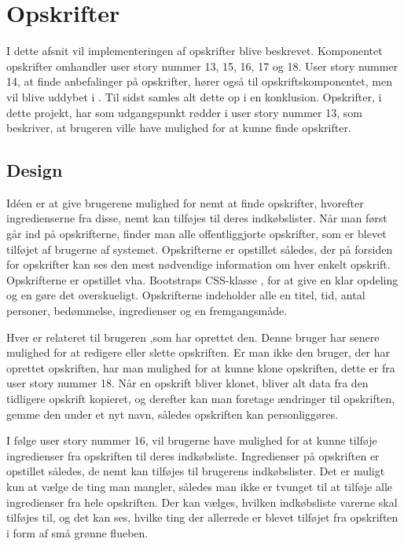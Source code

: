 \section{Opskrifter}
I dette afsnit vil implementeringen af opskrifter blive beskrevet. 
Komponentet opskrifter omhandler user story nummer 13, 15, 16, 17 og 18.
User story nummer 14, at finde anbefalinger på opskrifter, hører også til opskriftskomponentet, men vil blive uddybet i . 
Til sidst samles alt dette op i en konklusion. 
Opskrifter, i dette projekt, har som udgangspunkt rødder i user story nummer 13, som beskriver, at brugeren ville have mulighed for at kunne finde opskrifter.

\subsection{Design}
Idéen er at give brugerene mulighed for nemt at finde opskrifter, hvorefter ingredienserne fra disse, nemt kan tilføjes til deres indkøbslister.
Når man først går ind på opskrifterne, finder man alle offentliggjorte opskrifter, som er blevet tilføjet af brugerne af systemet.
Opskrifterne er opstillet således, der på forsiden for opskrifter kan ses den mest nødvendige information om hver enkelt opskrift.
Opskrifterne er opstillet vha. Bootstraps CSS-klasse , for at give en klar opdeling og en gøre det overskueligt.
Opskrifterne indeholder alle en titel, tid, antal personer, bedømmelse, ingredienser og en fremgangsmåde.

Hver  er relateret til brugeren ,som har oprettet den.
Denne bruger har senere mulighed for at redigere eller slette opskriften.
Er man ikke den bruger, der har oprettet opskriften, har man mulighed for at kunne klone opskriften, dette er fra user story nummer 18.
Når en opskrift bliver klonet, bliver alt data fra den tidligere opskrift kopieret, og derefter kan man foretage ændringer til opskriften, gemme den under et nyt navn, således opskriften kan personliggøres.

I følge user story nummer 16, vil brugerne have mulighed for at kunne tilføje ingredienser fra opskriften til deres indkøbsliste.
Ingredienser på opskriften er opstillet således, de nemt kan tilføjes til brugerens indkøbslister.
Det er muligt kun at vælge de ting man mangler, således man ikke er tvunget til at tilføje alle ingredienser fra hele opskriften.
Der kan vælges, hvilken indkøbsliste varerne skal tilføjes til, og det kan ses, hvilke ting der allerrede er blevet tilføjet fra opskriften i form af små grønne flueben.

